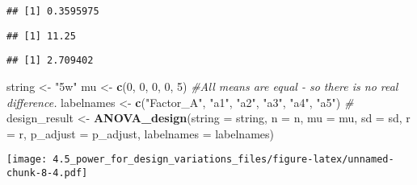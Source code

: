 \documentclass[]{article}
\newenvironment{Shaded}{\begin{snugshade}}{\end{snugshade}}
\newcommand{\KeywordTok}[1]{\textcolor[rgb]{0.13,0.29,0.53}{\textbf{#1}}}
\newcommand{\DataTypeTok}[1]{\textcolor[rgb]{0.13,0.29,0.53}{#1}}
\newcommand{\DecValTok}[1]{\textcolor[rgb]{0.00,0.00,0.81}{#1}}
\newcommand{\StringTok}[1]{\textcolor[rgb]{0.31,0.60,0.02}{#1}}
\newcommand{\CommentTok}[1]{\textcolor[rgb]{0.56,0.35,0.01}{\textit{#1}}}
\newcommand{\OperatorTok}[1]{\textcolor[rgb]{0.81,0.36,0.00}{\textbf{#1}}}
\newcommand{\NormalTok}[1]{#1}
\begin{document}
\begin{verbatim}
## [1] 0.3595975
\end{verbatim}

\begin{Shaded}
\end{Shaded}

\begin{verbatim}
## [1] 11.25
\end{verbatim}

\begin{Shaded}
\end{Shaded}

\begin{verbatim}
## [1] 2.709402
\end{verbatim}

\begin{Shaded}
\begin{Highlighting}[]
\NormalTok{string <-}\StringTok{ "5w"}
\NormalTok{mu <-}\StringTok{ }\KeywordTok{c}\NormalTok{(}\DecValTok{0}\NormalTok{, }\DecValTok{0}\NormalTok{, }\DecValTok{0}\NormalTok{, }\DecValTok{0}\NormalTok{, }\DecValTok{5}\NormalTok{) }\CommentTok{#All means are equal - so there is no real difference.}
\NormalTok{labelnames <-}\StringTok{ }\KeywordTok{c}\NormalTok{(}\StringTok{"Factor_A"}\NormalTok{, }\StringTok{"a1"}\NormalTok{, }\StringTok{"a2"}\NormalTok{, }\StringTok{"a3"}\NormalTok{, }\StringTok{"a4"}\NormalTok{, }\StringTok{"a5"}\NormalTok{) }\CommentTok{#}
\NormalTok{design_result <-}\StringTok{ }\KeywordTok{ANOVA_design}\NormalTok{(}\DataTypeTok{string =}\NormalTok{ string, }\DataTypeTok{n =}\NormalTok{ n, }\DataTypeTok{mu =}\NormalTok{ mu, }\DataTypeTok{sd =}\NormalTok{ sd, }\DataTypeTok{r =}\NormalTok{ r, }
                   \DataTypeTok{p_adjust =}\NormalTok{ p_adjust, }\DataTypeTok{labelnames =}\NormalTok{ labelnames)}
\end{Highlighting}
\end{Shaded}

\texttt{[image: 4.5\_power\_for\_design\_variations\_files/figure-latex/unnamed-chunk-8-4.pdf]}

\begin{Shaded}
\end{Shaded}
\end{document}
